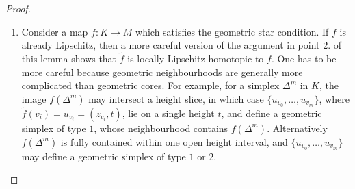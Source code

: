 \documentclass[a4paper,11pt]{article}
\theoremstyle{definition}
\newtheorem*{remark}{Remark}
\theoremstyle{plain}
\theoremstyle{remark}
\begin{document}
{\begin{proof}
\begin{enumerate}
As in the construction of the geometric simplicial approximation, $\mathscr{C}_{\sigma}$ is contractible, so we can extend $H$ to the interior of $\sigma$.  There is only one small modification: since $H_{|\partial \sigma}$ is not necessarily simplicial, for $\mathscr{C}_{\sigma}$ of type $1$, we consider the composition 
\begin{align*}
H_{|\sigma}: \sigma \rightarrow C\partial \sigma \xrightarrow{\xi} \mathscr{C}_{\sigma}
\end{align*} 
where $\xi(x,t) = (1-t)b_{\mathscr{C}_{\sigma}} + t H_{|\partial \sigma}(x)$. 
To show that this extension is Lipschitz, we assume that for every simplex $\tau$ (equipped with the norm-induced metric) of dimension $\leq k-1$, the restriction $H_{|\tau}: \tau \rightarrow \mathscr{C}_{\tau}$ is uniformly Lipschitz with Lipschitz constant $L_{k-1}$. Since $\mathscr{C}_{\sigma}$ is at most $k$-dimensional and $bs(K) \times [0,1]$ is uniformly bounded, by previous arguments, there exists a uniform Lipschitz constant $L_{k}$ such that $H_{|\sigma}: \sigma \rightarrow \mathscr{C}_{\sigma}$ is $L_{k}$-Lipschitz for all $k$-simplices $\sigma$. \\

By induction, there is a globally defined homotopy $H: bs(K) \times [0,1] \rightarrow M$ which is uniformly locally Lipschitz with respect to the set of simplices in $bs(K) \times [0,1]$. By previous arguments, $H$ is globally Lipschitz. It is proper because $\tilde{f}$ is proper. Therefore, it is a proper, Lipschitz homotopy between $\tilde{f}$ and $bs(\tilde{f})$. \\

\begin{remark}
More generally, this proof works for the barycentric subivision of $K$ relative to a subcomplex $L$ (induct only over simplices not in $L \times [0,1]$), or the standard subdivision $S(K)$ of $K$.
\end{remark}


\item Consider a map $f: K\rightarrow M$ which satisfies the geometric star condition. If $f$ is already Lipschitz, then a more careful version of the argument in point $2.$ of this lemma shows that $\tilde{f}$ is locally Lipschitz homotopic to $f$. One has to be more careful because geometric neighbourhoods are generally more complicated than geometric cores. For example, for a simplex $\Delta^{m}$ in $K$, the image $f(\Delta^{m})$ may intersect a height slice, in which case $\{u_{v_{0}}, \dots, u_{v_{m}}\}$, where $\tilde{f}(v_i) = u_{v_i} = (z_{v_i}, t)$, lie on a single height $t$, and define a geometric simplex of type $1$, whose neighbourhood contains $f(\Delta^{m})$. Alternatively $f(\Delta^{m})$  is fully contained within one open height interval, and $\{u_{v_{0}}, \dots, u_{v_{m}}\}$ may define a geometric simplex of type $1$ or $2$. \\


\end{enumerate}
\end{proof}}
\end{document}
